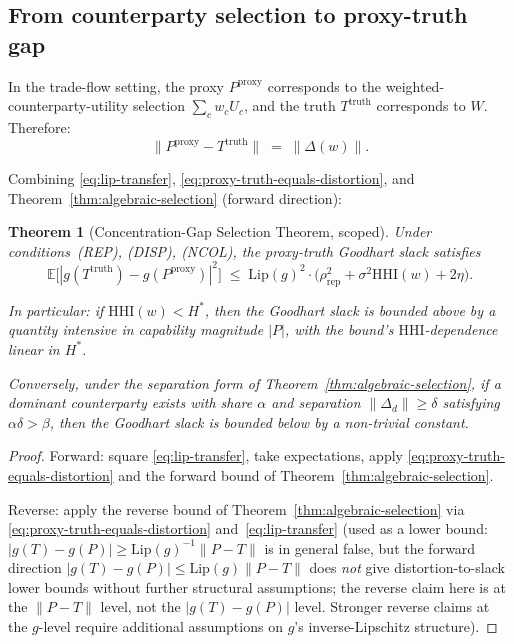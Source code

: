 \documentclass{article}
\newtheorem{theorem}{Theorem}
\newcommand{\HHI}{\mathrm{HHI}}
\newcommand{\Pproxy}{P^{\mathrm{proxy}}}
\newcommand{\Ttruth}{T^{\mathrm{truth}}}
\newcommand{\Lip}{\mathrm{Lip}}
\begin{document}
\subsection{From counterparty selection to proxy-truth gap}

In the trade-flow setting, the proxy $\Pproxy$ corresponds to the
weighted-counterparty-utility selection $\sum_c w_c U_c$, and the
truth $\Ttruth$ corresponds to $W$.  Therefore:
\begin{equation}
\label{eq:proxy-truth-equals-distortion}
  \|\Pproxy - \Ttruth\| \;=\; \|\Delta(w)\|.
\end{equation}

Combining \eqref{eq:lip-transfer},
\eqref{eq:proxy-truth-equals-distortion}, and
Theorem~\ref{thm:algebraic-selection} (forward direction):

\begin{theorem}[Concentration-Gap Selection Theorem, scoped]
\label{thm:concgap-scoped}
Under conditions~\textnormal{(REP)}, \textnormal{(DISP)},
\textnormal{(NCOL)}, the proxy-truth Goodhart slack satisfies
\begin{equation}
\label{eq:concgap-bound}
  \mathbb{E}\big[ |g(\Ttruth) - g(\Pproxy)|^2 \big]
  \;\leq\; \Lip(g)^2 \cdot \big(\rho_\mathrm{rep}^2 +
  \sigma^2 \HHI(w) + 2\eta\big).
\end{equation}

In particular: if $\HHI(w) < H^*$, then the Goodhart slack is
bounded above by a quantity intensive in capability magnitude
$|P|$, with the bound's $\HHI$-dependence linear in $H^*$.

Conversely, under the separation form of
Theorem~\ref{thm:algebraic-selection}, if a dominant counterparty
exists with share $\alpha$ and separation $\|\Delta_d\| \geq \delta$
satisfying $\alpha \delta > \beta$, then the Goodhart slack is
bounded below by a non-trivial constant.
\end{theorem}

\begin{proof}
Forward: square \eqref{eq:lip-transfer}, take expectations, apply
\eqref{eq:proxy-truth-equals-distortion} and the forward bound of
Theorem~\ref{thm:algebraic-selection}.

Reverse: apply the reverse bound of
Theorem~\ref{thm:algebraic-selection} via
\eqref{eq:proxy-truth-equals-distortion} and~\eqref{eq:lip-transfer}
(used as a lower bound: $|g(T) - g(P)| \geq \Lip(g)^{-1} \|P - T\|$
is in general false, but the forward direction
$|g(T) - g(P)| \leq \Lip(g) \|P - T\|$ does \emph{not} give
distortion-to-slack lower bounds without further structural
assumptions; the reverse claim here is at the $\|P - T\|$ level,
not the $|g(T) - g(P)|$ level.  Stronger reverse claims at the
$g$-level require additional assumptions on $g$'s
inverse-Lipschitz structure).
\end{proof}
\end{document}
